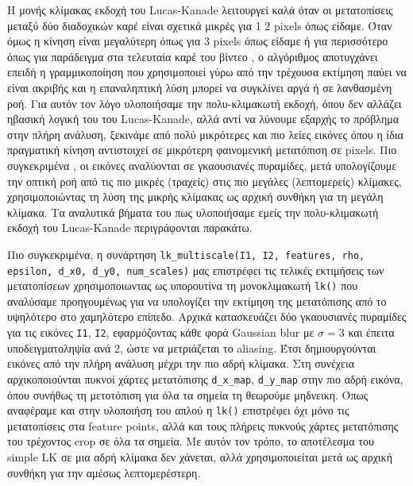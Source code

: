 \documentclass[12pt, a4paper]{article}
\begin{document}
Η μονής κλίμακας εκδοχή του Lucas-Kanade λειτουργεί καλά όταν οι μετατοπίσεις μεταξύ δύο διαδοχικών καρέ είναι σχετικά μικρές για 1 2 pixels όπως είδαμε.
Όταν όμως η κίνηση είναι μεγαλύτερη όπως για 3 pixels όπως είδαμε ή για περισσότερο όπως για παράδειγμα στα τελευταία καρέ του βίντεο , ο αλγόριθμος αποτυγχάνει επειδή η γραμμικοποίηση που χρησιμοποιεί γύρω από την τρέχουσα εκτίμηση παύει να είναι ακριβής και η επαναληπτική λύση μπορεί να συγκλίνει αργά ή σε λανθασμένη ροή.
Για αυτόν τον λόγο υλοποιήσαμε την πολυ-κλιμακωτή εκδοχή, όπου δεν αλλάζει ηβασική λογική του του Lucas-Kanade, αλλά  αντί να λύνουμε εξαρχής το πρόβλημα στην πλήρη ανάλυση, ξεκινάμε από πολύ μικρότερες και πιο λείες εικόνες όπου η ίδια πραγματική κίνηση αντιστοιχεί σε μικρότερη φαινομενική μετατόπιση σε pixels.
Πιο συγκεκριμένα , οι εικόνες αναλύονται σε γκαουσιανές πυραμίδες, μετά υπολογίζουμε την οπτική ροή από
τις πιο μικρές (τραχείς) στις πιο μεγάλες (λεπτομερείς) κλίμακες, χρησιμοποιώντας τη λύση
της μικρής κλίμακας ως αρχική συνθήκη για τη μεγάλη κλίμακα. Τα αναλυτικά βήματα του πως υλοποιήσαμε εμείς την πολυ-κλιμακωτή εκδοχή του Lucas-Kanade περιγράφονται παρακάτω.

Πιο συγκεκριμένα, η συνάρτηση \texttt{lk\_multiscale(I1, I2, features, rho, epsilon, d\_x0, d\_y0, num\_scales)} μας επιστρέφει τις τελικές εκτιμήσεις των μετατοπίσεων χρησιμοποιωντας ως υπορουτίνα τη μονοκλιμακωτή \texttt{lk()} που αναλύσαμε προηγουμένως για να υπολογίζει την εκτίμηση της μετατόπισης από το υψηλότερο στο χαμηλότερο επίπεδο.
Αρχικά κατασκευάζει δύο γκαουσιανές πυραμίδες για τις εικόνες \texttt{I1}, \texttt{I2}, εφαρμόζοντας κάθε φορά Gaussian blur με $\sigma=3$ και έπειτα υποδειγματοληψία ανά 2, ώστε να μετριάζεται το aliasing.
Έτσι δημιουργούνται εικόνες από την πλήρη ανάλυση μέχρι την πιο αδρή κλίμακα. Στη συνέχεια αρχικοποιούνται πυκνοί χάρτες μετατόπισης \texttt{d\_x\_map}, \texttt{d\_y\_map} στην πιο αδρή εικόνα, όπου συνήθως τη μετοτόπιση για όλα τα σημεία τη θεωρούμε μηδνεικη.
Όπως αναφέραμε και στην υλοποιήση του απλού  η \texttt{lk()}  επιστρέφει όχι μόνο τις μετατοπίσεις στα feature points, αλλά και τους πλήρεις πυκνούς χάρτες μετατόπισης του τρέχοντος crop σε όλα τα σημεία. Με αυτόν τον τρόπο, το αποτέλεσμα του simple LK σε μια αδρή κλίμακα δεν χάνεται, αλλά χρησιμοποιείται μετά ως αρχική συνθήκη για την αμέσως λεπτομερέστερη.
\end{document}
